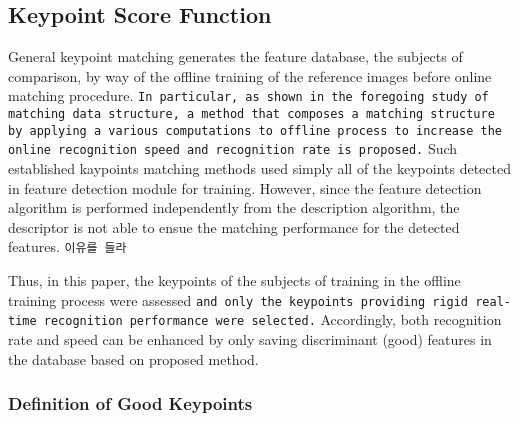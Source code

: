 
\subsection{Keypoint Score Function}

General keypoint matching generates the feature database, the subjects of comparison, by way of the offline training of the reference images before online matching procedure. \texttt{In particular, as shown in the foregoing study of matching data structure, a method that composes a matching structure by applying a various computations to offline process to increase the online recognition speed and recognition rate is proposed.} Such established kaypoints matching methods used simply all of the keypoints detected in feature detection module for training. However, since the feature detection algorithm is performed independently from the description algorithm, the descriptor is not able to ensue the matching performance for the detected features. \texttt{이유를 들라}


Thus, in this paper, the keypoints of the subjects of training in the offline training process were assessed \texttt{and only the keypoints providing rigid real-time recognition performance were selected.} Accordingly, both recognition rate and speed can be enhanced by only saving discriminant (good) features in the database based on proposed method.


\subsubsection{Definition of Good Keypoints}

